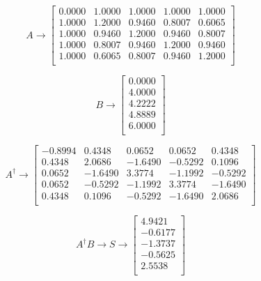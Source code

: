 \documentclass[a4paper,12pt]{scrreprt}
\begin{document}
\begin{equation}
        A\to \begin{bmatrix}
                0.0000 & 1.0000 & 1.0000 & 1.0000 & 1.0000 \\
                1.0000 & 1.2000 & 0.9460 & 0.8007 & 0.6065 \\
                1.0000 & 0.9460 & 1.2000 & 0.9460 & 0.8007 \\
                1.0000 & 0.8007 & 0.9460 & 1.2000 & 0.9460 \\
                1.0000 & 0.6065 & 0.8007 & 0.9460 & 1.2000 \\
        \end{bmatrix}
\end{equation}

\begin{equation}
        B\to \begin{bmatrix}
                0.0000 \\
                4.0000 \\
                4.2222 \\
                4.8889 \\
                6.0000 \\
        \end{bmatrix}
\end{equation}

\begin{equation}
        A^{\dag}\to \begin{bmatrix}
                -0.8994 & 0.4348  & 0.0652  & 0.0652  & 0.4348  \\
                0.4348  & 2.0686  & -1.6490 & -0.5292 & 0.1096  \\
                0.0652  & -1.6490 & 3.3774  & -1.1992 & -0.5292 \\
                0.0652  & -0.5292 & -1.1992 & 3.3774  & -1.6490 \\
                0.4348  & 0.1096  & -0.5292 & -1.6490 & 2.0686  \\
        \end{bmatrix}
\end{equation}

\begin{equation}
        A^{\dag}B\to S\to \begin{bmatrix}
                4.9421  \\
                -0.6177 \\
                -1.3737 \\
                -0.5625 \\
                2.5538  \\
        \end{bmatrix}
\end{equation}
\end{document}
